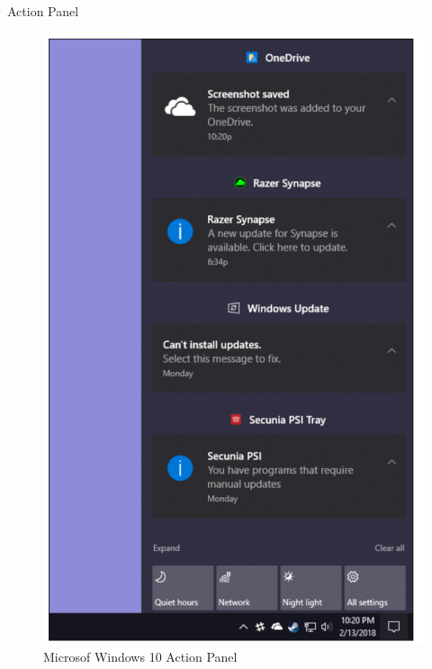 \documentclass{beamer}
\begin{document}
\begin{frame}[t]{Action Panel}
	\begin{figure}[h]
		\centering
		\includegraphics[scale=0.6]{images/lec08-pic08.png}
		\caption{Microsof Windows 10 Action Panel}
	\end{figure}
\end{frame}
\end{document}
